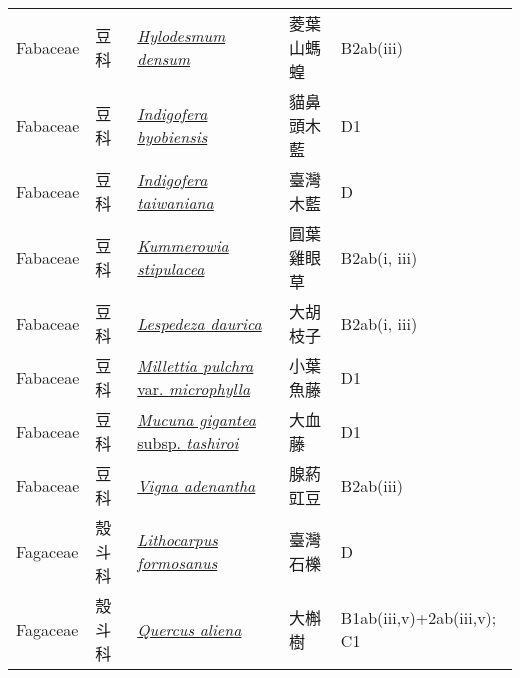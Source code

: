 {\begin{longtable}{p{2.5cm}p{2.5cm}p{4.5cm}p{2.5cm}p{3cm}}
    Fabaceae & 豆科 & \href{http://www.theplantlist.org/tpl1.1/search?q=Hylodesmum+densum}{\textit{Hylodesmum densum} } & 菱葉山螞蝗 & B2ab(iii) \index{Hylodesmum@\textit{Hylodesmum}!densum@\textit{densum}}  \index{菱葉山螞蝗} \\
    Fabaceae & 豆科 & \href{http://www.theplantlist.org/tpl1.1/search?q=Indigofera+byobiensis}{\textit{Indigofera byobiensis} } & 貓鼻頭木藍 & D1 \index{Indigofera@\textit{Indigofera}!byobiensis@\textit{byobiensis}}  \index{貓鼻頭木藍} \\
    Fabaceae & 豆科 & \href{http://www.theplantlist.org/tpl1.1/search?q=Indigofera+taiwaniana}{\textit{Indigofera taiwaniana} } & 臺灣木藍 & D \index{Indigofera@\textit{Indigofera}!taiwaniana@\textit{taiwaniana}}  \index{臺灣木藍} \\
    Fabaceae & 豆科 & \href{http://www.theplantlist.org/tpl1.1/search?q=Kummerowia+stipulacea}{\textit{Kummerowia stipulacea} } & 圓葉雞眼草 & B2ab(i, iii) \index{Kummerowia@\textit{Kummerowia}!stipulacea@\textit{stipulacea}}  \index{圓葉雞眼草} \\
    Fabaceae & 豆科 & \href{http://www.theplantlist.org/tpl1.1/search?q=Lespedeza+daurica}{\textit{Lespedeza daurica} } & 大胡枝子 & B2ab(i, iii) \index{Lespedeza@\textit{Lespedeza}!daurica@\textit{daurica}}  \index{大胡枝子} \\
    Fabaceae & 豆科 & \href{http://www.theplantlist.org/tpl1.1/search?q=Millettia+pulchra+var.+microphylla}{\textit{Millettia pulchra} var. \textit{microphylla} } & 小葉魚藤 & D1 \index{Millettia@\textit{Millettia}!pulchra@\textit{pulchra}!var. microphylla@var. \textit{microphylla}}  \index{小葉魚藤} \\
    Fabaceae & 豆科 & \href{http://www.theplantlist.org/tpl1.1/search?q=Mucuna+gigantea+subsp.+tashiroi}{\textit{Mucuna gigantea} subsp. \textit{tashiroi} } & 大血藤 & D1 \index{Mucuna@\textit{Mucuna}!gigantea@\textit{gigantea}!subsp. tashiroi@subsp. \textit{tashiroi}}  \index{大血藤} \\
    Fabaceae & 豆科 & \href{http://www.theplantlist.org/tpl1.1/search?q=Vigna+adenantha}{\textit{Vigna adenantha} } & 腺葯豇豆 & B2ab(iii) \index{Vigna@\textit{Vigna}!adenantha@\textit{adenantha}}  \index{腺葯豇豆} \\
    Fagaceae & 殼斗科 & \href{http://www.theplantlist.org/tpl1.1/search?q=Lithocarpus+formosanus}{\textit{Lithocarpus formosanus} } & 臺灣石櫟 & D \index{Lithocarpus@\textit{Lithocarpus}!formosanus@\textit{formosanus}}  \index{臺灣石櫟} \\
    Fagaceae & 殼斗科 & \href{http://www.theplantlist.org/tpl1.1/search?q=Quercus+aliena}{\textit{Quercus aliena} } & 大槲樹 & B1ab(iii,v)+2ab(iii,v); C1 \index{Quercus@\textit{Quercus}!aliena@\textit{aliena}}  \index{大槲樹} \\

\end{longtable}}
